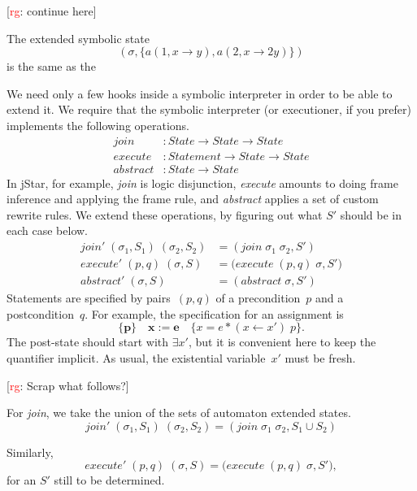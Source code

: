 \documentclass[a4paper]{article}
\newcommand{\rg}[1]{\todo{rg}{#1}}
\newcommand{\todo}[2]{{\small [\textcolor{red}{#1}: #2]}}
\theoremstyle{slanted}
\theoremstyle{definition}
\theoremstyle{remark}
\begin{document}
\rg{continue here}


The extended symbolic state
  \[ (\sigma, \{a(1,x\to y), a(2,x\to 2y)\}) \]
is the same as the 


We need only a few hooks inside a symbolic interpreter in order to be able to extend it.
We require that the symbolic interpreter (or executioner, if you prefer) implements the following operations.
\begin{align}
\mathit{join} &: \mathit{State} \to \mathit{State} \to \mathit{State} \\
\mathit{execute} &: \mathit{Statement} \to \mathit{State} \to \mathit{State} \\
\mathit{abstract} &: \mathit{State} \to \mathit{State}
\end{align}
In jStar, for example, \textit{join} is logic disjunction, \textit{execute} amounts to doing frame inference and applying the frame rule, and \textit{abstract} applies a set of custom rewrite rules.
We extend these operations, by figuring out what $S'$ should be in each case below.
\begin{align}
\mathit{join}'\;(\sigma_1, S_1)\;(\sigma_2,S_2) &=
    (\mathit{join}\;\sigma_1\;\sigma_2, S') \\
\mathit{execute}'\;(p,q)\;(\sigma,S) &=
    \bigl(\mathit{execute}\;(p,q)\;\sigma,S'\bigr) \\
\mathit{abstract}'\;(\sigma,S) &=
    (\mathit{abstract}\;\sigma,S')
\end{align}
Statements are specified by pairs~$(p,q)$ of a precondition~$p$ and a postcondition~$q$.
For example, the specification for an assignment is
  \[ \{\mathbf p\}\quad
  \mathbf x:=\mathbf e
  \quad\{x=e * (x\gets x')\;p\}.\]
The post-state should start with $\exists x'$, but it is convenient here to keep the quantifier implicit.
As usual, the existential variable~$x'$ must be fresh.


\rg{Scrap what follows?}

For \textit{join}, we take the union of the sets of automaton extended states.
  \[ \mathit{join}'\;(\sigma_1, S_1)\;(\sigma_2,S_2)=
    (\mathit{join}\;\sigma_1\;\sigma_2, S_1\cup S_2) \]

Similarly,
  \[ \mathit{execute}'\;(p,q)\;(\sigma,S)=
    \bigl(\mathit{execute}\;(p,q)\;\sigma,S'), \]
for an $S'$ still to be determined.
\end{document}
